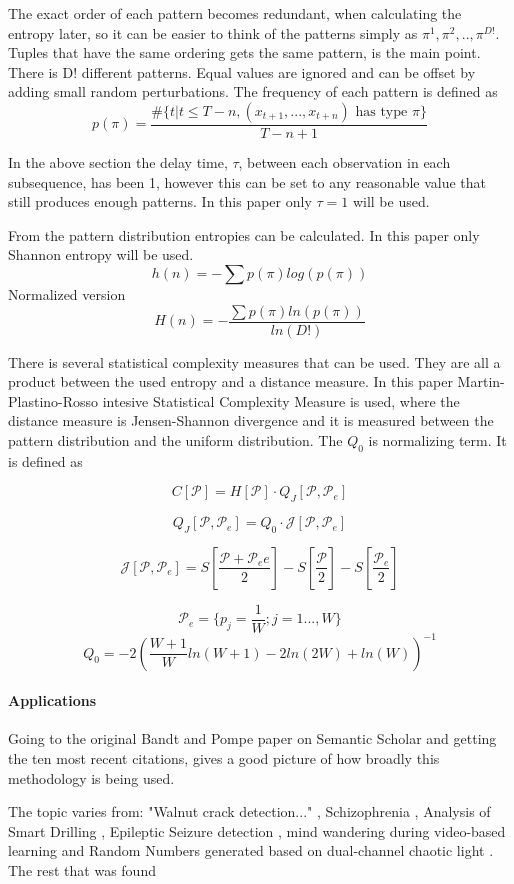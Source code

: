 The exact order of each pattern becomes redundant, when calculating the entropy later, so it can be easier to think of the patterns simply as $\pi^1,\pi^2,..,\pi^{D!}$. Tuples that have the same ordering gets the same pattern, is the main point. There is D! different patterns. Equal values are ignored and can be offset by adding small random perturbations. The frequency of each pattern is defined as
$$p(\pi)=\frac{\#\{t|t\leq T-n,(x_{t+1},...,x_{t+n}) \mbox{ has type }\pi\}}{T-n+1}$$
\cite{Bandt2002}

In the above section the delay time, $\tau$, between each observation in each subsequence, has been 1, however this can be set to any reasonable value that still produces enough patterns. In this paper only $\tau=1$ will be used.

From the pattern distribution entropies can be calculated. In this paper only Shannon entropy will be used. 
$$h(n)=-\sum p(\pi) log(p(\pi))$$
Normalized version
$$H(n)=-\frac{\sum p(\pi) ln(p(\pi))}{ln(D!)}$$

There is several statistical complexity measures that can be used. They are all a product between the used entropy and a distance measure. In this paper Martin-Plastino-Rosso intesive Statistical Complexity Measure is used, where the distance measure is Jensen-Shannon divergence and it is measured between the pattern distribution and the uniform distribution. The $Q_0$ is normalizing term. It is defined as

$$C[\mathscr{P}]=H[\mathscr{P}]\cdot Q_J[\mathscr{P},\mathscr{P}_e]$$

$$Q_J[\mathscr{P},\mathscr{P}_e]=Q_0\cdot \mathscr{J}[\mathscr{P},\mathscr{P}_e]$$

$$\mathscr{J}[\mathscr{P},\mathscr{P}_e]=S[\frac{\mathscr{P}+\mathscr{P}_ee}{2}]-S[\frac{\mathscr{P}}{2}]-S[\frac{\mathscr{P}_e}{2}]$$

$$\mathscr{P}_e=\{p_j=\frac{1}{W};j=1...,W\}$$
$$Q_0 = -2(\frac{W+1}{W}ln(W+1)-2ln(2W)+ln(W))^{-1}$$
\cite{Amigo2023b}

\paragraph{Applications}
Going to the original Bandt and Pompe paper \cite{Bandt2002} on Semantic Scholar and getting the ten most recent citations, gives a good picture of how broadly this methodology is being used.

The topic varies from: "Walnut crack detection..." \cite{Zhang2024}, Schizophrenia \cite{Wang2024}, Analysis of Smart Drilling \cite{Szwajka2024}, Epileptic Seizure detection \cite{AbhishekParikh2024}, mind wandering during video-based learning \cite{Tang2024} and Random Numbers generated based on dual-channel chaotic light \cite{Liu2024}. The rest that was found \cite{Demirel2024, Du2024, Sun2024, Li2024}

